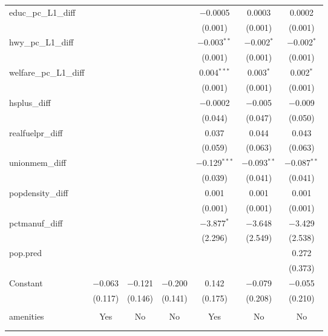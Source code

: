 \begin{table}[!htbp]
\begin{tabular}{@{\extracolsep{5pt}}lcccccc}
  educ\_pc\_L1\_diff &  &  &  & $-$0.0005 & 0.0003 & 0.0002 \\ 
  &  &  &  & (0.001) & (0.001) & (0.001) \\ 
  hwy\_pc\_L1\_diff &  &  &  & $-$0.003$^{**}$ & $-$0.002$^{*}$ & $-$0.002$^{*}$ \\ 
  &  &  &  & (0.001) & (0.001) & (0.001) \\ 
  welfare\_pc\_L1\_diff &  &  &  & 0.004$^{***}$ & 0.003$^{*}$ & 0.002$^{*}$ \\ 
  &  &  &  & (0.001) & (0.001) & (0.001) \\ 
  hsplus\_diff &  &  &  & $-$0.0002 & $-$0.005 & $-$0.009 \\ 
  &  &  &  & (0.044) & (0.047) & (0.050) \\ 
  realfuelpr\_diff &  &  &  & 0.037 & 0.044 & 0.043 \\ 
  &  &  &  & (0.059) & (0.063) & (0.063) \\ 
  unionmem\_diff &  &  &  & $-$0.129$^{***}$ & $-$0.093$^{**}$ & $-$0.087$^{**}$ \\ 
  &  &  &  & (0.039) & (0.041) & (0.041) \\ 
  popdensity\_diff &  &  &  & 0.001 & 0.001 & 0.001 \\ 
  &  &  &  & (0.001) & (0.001) & (0.001) \\ 
  pctmanuf\_diff &  &  &  & $-$3.877$^{*}$ & $-$3.648 & $-$3.429 \\ 
  &  &  &  & (2.296) & (2.549) & (2.538) \\ 
  pop.pred &  &  &  &  &  & 0.272 \\ 
  &  &  &  &  &  & (0.373) \\ 
  Constant & $-$0.063 & $-$0.121 & $-$0.200 & 0.142 & $-$0.079 & $-$0.055 \\ 
  & (0.117) & (0.146) & (0.141) & (0.175) & (0.208) & (0.210) \\ 
 \hline \\[-1.8ex] 
amenities & Yes & No & No & Yes & No & No \\ 
\hline \\[-1.8ex] 
\hline 
\hline \\[-1.8ex] 
\end{tabular} 
\end{table} 

